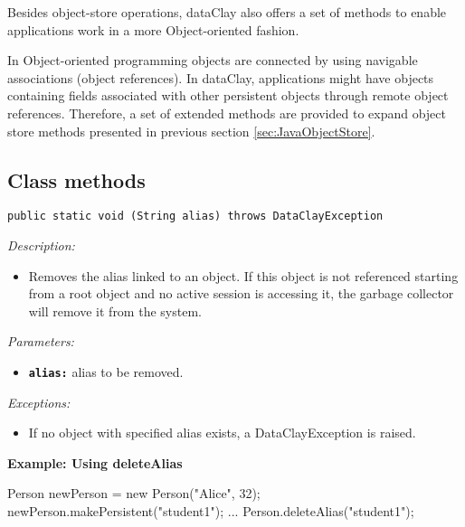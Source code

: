 Besides object-store operations, dataClay also offers a set of methods to enable applications work in a more Object-oriented fashion. 

In Object-oriented programming objects are connected by using navigable associations (object references). In dataClay, applications might have objects containing fields associated with other persistent objects through remote object references. Therefore, a set of extended methods are provided to expand object store methods presented in previous section \ref{sec:JavaObjectStore}.


\subsection{Class methods}
\label{sec:JavaClassMethods}


\begin{dBox}
\texttt{public static void  (String alias) \newline throws DataClayException}
\LINE

{\it Description:}

\begin{itemize}
    \item Removes the alias linked to an object. If this object is not referenced starting from a root object and no active session is accessing it, the garbage collector will remove it from the system.
\end{itemize}


{\it Parameters:}

\begin{itemize}
    \item \texttt{\bfseries alias:} alias to be removed.
\end{itemize}

{\it Exceptions:}

\begin{itemize}
    \item If no object with specified alias exists, a DataClayException is raised.
\end{itemize}

\end{dBox}

\begin{tBox}
\textcolor{basecolor} {\bf Example: Using deleteAlias}
\begin{java}
Person newPerson = new Person("Alice", 32);
newPerson.makePersistent("student1");
...
Person.deleteAlias("student1");
\end{java}
\end{tBox}


